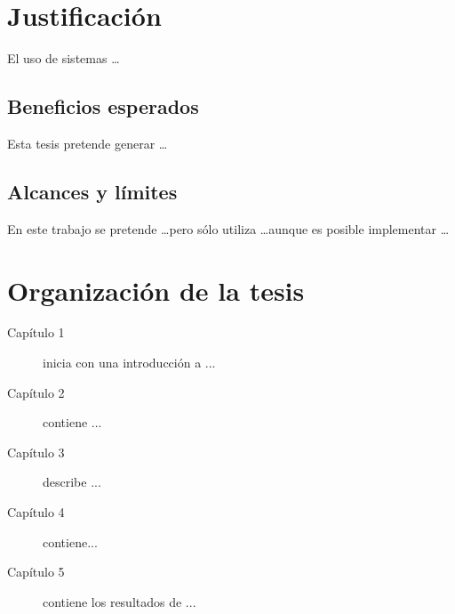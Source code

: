 \section{Justificación}
El uso de sistemas \ldots

\subsection{Beneficios esperados}
Esta tesis pretende generar \ldots

\subsection{Alcances y límites}
En este trabajo se pretende \ldots pero sólo utiliza \ldots aunque es posible implementar \ldots

\section{Organización de la tesis}

\begin{description}

\item[Capítulo 1] inicia con una introducción a ...

\item[Capítulo 2] contiene ... 

\item[Capítulo 3] describe ...

\item[Capítulo 4] contiene...

\item[Capítulo 5] contiene los resultados de ...

\end{description}

